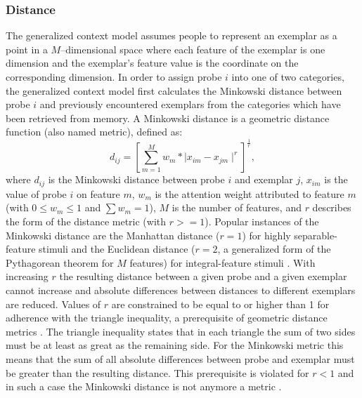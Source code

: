 \documentclass[a4paper,man,natbib]{apa6}
\begin{document}
\subsubsection{Distance}
The generalized context model \citep{nosofsky1984choice,nosofsky1986attention} assumes people to represent an exemplar as a point in a $M$--dimensional space where each feature of the exemplar is one dimension and the exemplar's feature value is the coordinate on the corresponding dimension. In order to assign probe $i$ into one of two categories, the generalized context model first calculates the Minkowski distance between probe $i$ and previously encountered exemplars from the categories which have been retrieved from memory. A Minkowski distance is a geometric distance function (also named metric), defined as: 
\begin{equation}
d_{ij} = \left[\sum\limits_{m=1}^M w_{m}*\mid x_{im} - x_{jm}\mid ^r\right]^\frac{1}{r},
\end{equation}
where $d_{ij}$ is the Minkowski distance between probe $i$ and exemplar $j$, $x_{im}$ is the value of probe $i$ on feature $m$, $w_{m}$ is the attention weight attributed to feature $m$ (with $0 \leq w_{m} \leq 1$ and $\sum w_{m} = 1$), $M$ is the number of features, and $r$ describes the form of the distance metric (with $r >= 1$). Popular instances of the Minkowski distance are the Manhattan distance ($r = 1$) for highly separable-feature stimuli and the Euclidean distance ($r = 2$, a generalized form of the Pythagorean theorem for $M$ features) for integral-feature stimuli \citep{shepard1964attention, nosofsky1986attention, garner1974processing}. With increasing $r$ the resulting distance between a given probe and a given exemplar cannot increase and absolute differences between distances to different exemplars are reduced. Values of $r$ are constrained to be equal to or higher than 1 for adherence with the triangle inequality, a prerequisite of geometric distance metrics \citep{jakel2008similarity,francois2007concentration,tversky1982similarity,beals1968foundations}. The triangle inequality states that in each triangle the sum of two sides must be at least as great as the remaining side. For the Minkowski metric this means that the sum of all absolute differences between probe and exemplar must be greater than the resulting distance. This prerequisite is violated for $r < 1$ and in such a case the Minkowski distance is not anymore a metric \citep[][p. 5]{kress1989linear}. 

\end{document}
